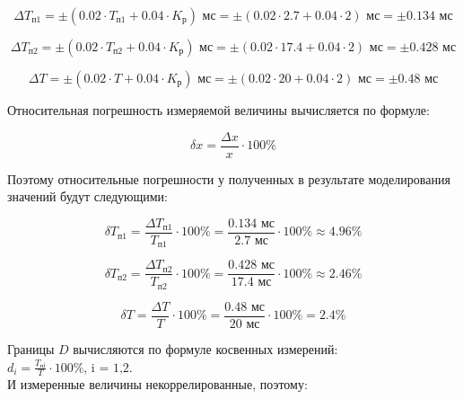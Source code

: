 \begin{displaymath}
	\Delta T_{\text{п1}} = \pm \left( 0.02 \cdot T_{\text{п1}} + 0.04 \cdot K_{\text{р}} \right) \text{ мс} = \pm \left( 0.02 \cdot 2.7 + 0.04 \cdot 2 \right) \text{ мс} = \pm 0.134 \text{ мс} 
\end{displaymath}

\begin{displaymath}
	\Delta T_{\text{п2}} = \pm \left( 0.02 \cdot T_{\text{п2}} + 0.04 \cdot K_{\text{р}} \right) \text{ мс} = \pm \left( 0.02 \cdot 17.4 + 0.04 \cdot 2 \right) \text{ мс} = \pm 0.428 \text{ мс} 
\end{displaymath}

\begin{displaymath}
	\Delta T = \pm \left( 0.02 \cdot T + 0.04 \cdot K_{\text{р}} \right) \text{ мс} = \pm \left( 0.02 \cdot 20 + 0.04 \cdot 2 \right) \text{ мс} = \pm 0.48 \text{ мс} 
\end{displaymath}

Относительная погрешность измеряемой величины вычисляется по формуле:

\begin{equation}
	\delta x = \frac{\Delta x}{x} \cdot 100\%
\end{equation}

Поэтому относительные погрешности у полученных в результате моделирования значений будут следующими:

\begin{displaymath}
	\delta T_{\text{п1}} = \frac{\Delta T_{\text{п1}}}{T_{\text{п1}}} \cdot 100\% = \frac{0.134 \text{ мс}}{2.7 \text{ мс}} \cdot 100\% \approx 4.96 \%
\end{displaymath}

\begin{displaymath}
	\delta T_{\text{п2}} = \frac{\Delta T_{\text{п2}}}{T_{\text{п2}}} \cdot 100\% = \frac{0.428 \text{ мс}}{17.4 \text{ мс}} \cdot 100\% \approx 2.46 \%
\end{displaymath}

\begin{displaymath}
	\delta T = \frac{\Delta T}{T} \cdot 100\% = \frac{0.48 \text{ мс}}{20 \text{ мс}} \cdot 100\% = 2.4 \%
\end{displaymath}

Границы $D$ вычисляются по формуле косвенных измерений: $d_i = \frac{T_\text{пi}}{T} \cdot 100\% \text{, i = 1,2}$.\\\noindent И измеренные величины некоррелированные, поэтому:

